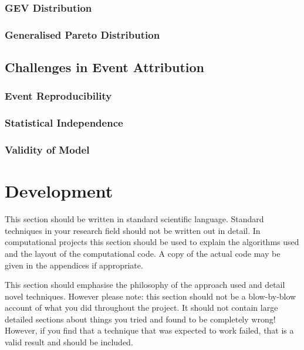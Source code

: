 \documentclass[12pt,a4paper]{report}
\begin{document}
\subsection{GEV Distribution}\label{subsec:gev}

\subsection{Generalised Pareto Distribution}\label{subsec:gpd}

\section{Challenges in Event Attribution}\label{sec:attrchallenge}

\subsection{Event Reproducibility}\label{subsec:eventrepro}

\subsection{Statistical Independence}\label{subsec:statindep}

\subsection{Validity of Model}\label{subsec:modelvalid}

\chapter{Development}\label{ch:dev}


This section should be written in standard scientific
language. Standard techniques in your research field should not be
written out in detail. In computational projects this section should
be used to explain the algorithms used and the layout of the
computational code. A copy of the actual code may be given in the
appendices if appropriate.

This section should emphasise the philosophy of the approach used and
detail novel techniques. However please note: this section should not
be a blow-by-blow account of what you did throughout the project. It
should not contain large detailed sections about things you tried and
found to be completely wrong! However, if you find that a technique
that was expected to work failed, that is a valid result and should be
included.
\end{document}
